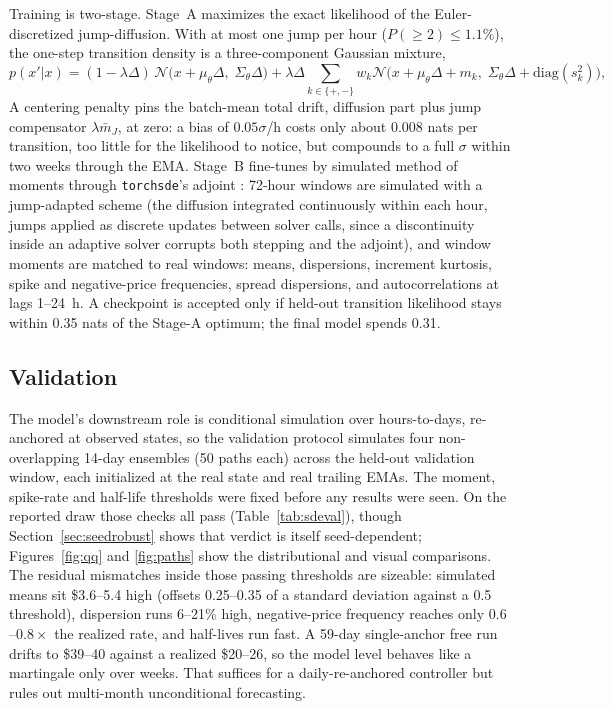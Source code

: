 \documentclass[11pt]{article}
\begin{document}
Training is two-stage. Stage~A
maximizes the exact likelihood of the Euler-discretized jump-diffusion.
With at most one jump per hour ($P(\ge 2) \le 1.1\%$), the one-step
transition density is a three-component Gaussian mixture,
\begin{equation}
p(x'|x) = (1{-}\lambda\Delta)\,
\mathcal{N}\big(x{+}\mu_\theta\Delta,\; \Sigma_\theta\Delta\big)
+ \lambda\Delta\!\sum_{k \in \{+, -\}} w_k
\mathcal{N}\big(x{+}\mu_\theta\Delta{+}m_k,\;
\Sigma_\theta\Delta{+}\mathrm{diag}(s_k^2)\big),
\label{eq:nll}
\end{equation}
A centering
penalty pins the batch-mean total drift, diffusion part plus
jump compensator $\lambda \bar m_J$, at zero: a bias of $0.05\sigma$/h
costs only about 0.008 nats per transition, too little for the likelihood
to notice, but compounds to a full $\sigma$ within two weeks through the
EMA. Stage~B fine-tunes
by simulated method of moments \cite{duffie1993} through
\texttt{torchsde}'s adjoint \cite{li2020}:
72-hour windows are simulated with a jump-adapted scheme (the diffusion
integrated continuously within each hour, jumps applied as discrete
updates between solver calls, since a discontinuity inside an adaptive
solver corrupts both stepping and the adjoint), and window moments are
matched to real windows: means, dispersions, increment kurtosis, spike and
negative-price frequencies, spread dispersions, and autocorrelations at
lags 1--24~h. A checkpoint is accepted only if held-out
transition likelihood stays within 0.35 nats of the Stage-A optimum; the
final model spends 0.31.

\subsection{Validation}
The model's downstream role is conditional simulation over hours-to-days,
re-anchored at observed states, so the validation protocol simulates four
non-overlapping 14-day ensembles (50 paths each) across the held-out
validation window, each initialized at the real state and real trailing
EMAs. The moment, spike-rate and half-life thresholds were fixed before
any results were seen. On the reported draw those checks all pass (Table~\ref{tab:sdeval}), though
Section~\ref{sec:seedrobust} shows that verdict is itself seed-dependent; Figures~\ref{fig:qq} and \ref{fig:paths} show
the distributional and visual comparisons. The residual mismatches inside
those passing thresholds are sizeable: simulated means sit \$3.6--5.4 high
(offsets 0.25--0.35 of a standard deviation against a 0.5 threshold),
dispersion runs 6--21\% high,
negative-price frequency reaches only $0.6$--$0.8\times$ the realized
rate, and half-lives run fast. A 59-day single-anchor free run drifts to
\$39--40 against a realized \$20--26, so the model level behaves like a
martingale only over weeks. That suffices for a daily-re-anchored controller
but rules out multi-month unconditional forecasting.
\end{document}
